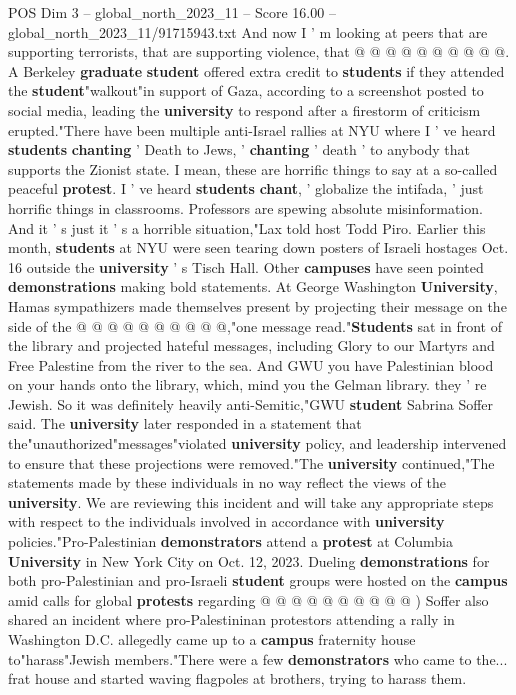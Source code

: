 \begin{textsample}{POS Dim 3 – global\_north\_2023\_11 – Score 16.00 – global\_north\_2023\_11/91715943.txt}
And now I ' m looking at peers that are supporting terrorists, that are supporting violence, that @ @ @ @ @ @ @ @ @ @.
A Berkeley \textbf{graduate} \textbf{student} offered extra credit to \textbf{students} if they attended the \textbf{student}"walkout"in support of Gaza, according to a screenshot posted to social media, leading the \textbf{university} to respond after a firestorm of criticism erupted."There have been multiple anti-Israel rallies at NYU where I ' ve heard \textbf{students} \textbf{chanting} ' Death to Jews, ' \textbf{chanting} ' death ' to anybody that supports the Zionist state.
I mean, these are horrific things to say at a so-called peaceful \textbf{protest}.
I ' ve heard \textbf{students} \textbf{chant}, ' globalize the intifada, ' just horrific things in classrooms.
Professors are spewing absolute misinformation.
And it ' s just it ' s a horrible situation,"Lax told host Todd Piro.
Earlier this month, \textbf{students} at NYU were seen tearing down posters of Israeli hostages Oct. 16 outside the \textbf{university} ' s Tisch Hall.
Other \textbf{campuses} have seen pointed \textbf{demonstrations} making bold statements.
At George Washington \textbf{University}, Hamas sympathizers made themselves present by projecting their message on the side of the @ @ @ @ @ @ @ @ @ @,"one message read."\textbf{Students} sat in front of the library and projected hateful messages, including Glory to our Martyrs and Free Palestine from the river to the sea.
And GWU you have Palestinian blood on your hands onto the library, which, mind you the Gelman library. they ' re Jewish.
So it was definitely heavily anti-Semitic,"GWU \textbf{student} Sabrina Soffer said.
The \textbf{university} later responded in a statement that the"unauthorized"messages"violated \textbf{university} policy, and leadership intervened to ensure that these projections were removed."The \textbf{university} continued,"The statements made by these individuals in no way reflect the views of the \textbf{university}.
We are reviewing this incident and will take any appropriate steps with respect to the individuals involved in accordance with \textbf{university} policies."Pro-Palestinian \textbf{demonstrators} attend a \textbf{protest} at Columbia \textbf{University} in New York City on Oct. 12, 2023.
Dueling \textbf{demonstrations} for both pro-Palestinian and pro-Israeli \textbf{student} groups were hosted on the \textbf{campus} amid calls for global \textbf{protests} regarding @ @ @ @ @ @ @ @ @ @ ) Soffer also shared an incident where pro-Palestininan protestors attending a rally in Washington D.C. allegedly came up to a \textbf{campus} fraternity house to"harass"Jewish members."There were a few \textbf{demonstrators} who came to the... frat house and started waving flagpoles at brothers, trying to harass them.

\end{textsample}
